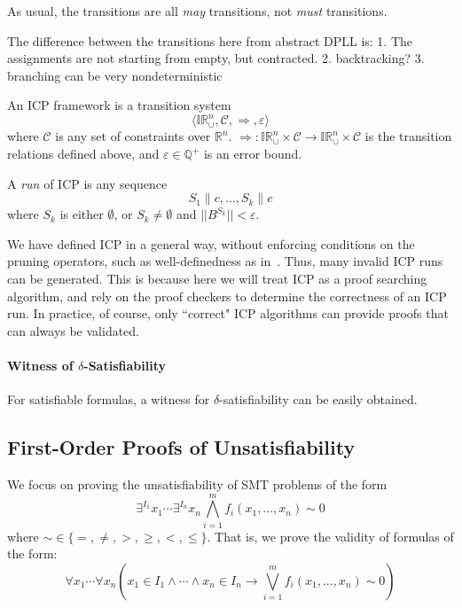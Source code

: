 \documentclass[envcountsect]{llncs}
\begin{document}
As usual, the transitions are all {\em may} transitions, not {\em must}
transitions.
\begin{remark}
The difference between the transitions here from abstract DPLL is:
1. The assignments are not starting from empty, but contracted.
2. backtracking?
3. branching can be very nondeterministic
\end{remark}
\begin{definition}
An ICP framework is a transition system
$$\langle \mathbb{IR}_{\cup}^n, \mathcal{C}, \Longrightarrow,
\varepsilon\rangle$$
where $\mathcal{C}$ is any set of constraints over $\mathbb{R}^n$.
$\Longrightarrow: \mathbb{IR}_{\cup}^n\times
\mathcal{C}\rightarrow \mathbb{IR}_{\cup}^n\times \mathcal{C}$ is the transition
relations defined above, and $\varepsilon\in \mathbb{Q}^+$ is an
error bound.

A {\em run} of ICP is any sequence
$$S_1\parallel c, ... , S_k\parallel c$$
where $S_k$ is either $\emptyset$, or $S_k\neq \emptyset$ and
$||B^{S_k}||<\varepsilon$.
\end{definition}
\begin{remark}
We have defined ICP in a general way, without enforcing conditions
on the pruning operators, such as well-definedness as in~\cite{}. Thus, many
invalid ICP runs can be generated. This is
because here we will treat ICP as a proof searching algorithm, and rely on the
proof checkers to determine the correctness of an ICP run. In practice, of
course, only
``correct" ICP algorithms can provide proofs that can always be validated.
\end{remark}




\paragraph{Witness of $\delta$-Satisfiability}
For satisfiable formulas, a witness for $\delta$-satisfiability can be
easily obtained.


\subsection{First-Order Proofs of Unsatisfiability}

We focus on proving the unsatisfiability of SMT problems of the form
$$\exists^{I_1} x_1\cdots \exists^{I_n} x_n \bigwedge_{i=1}^m
f_i(x_1,...,x_n)\sim 0$$
where $\sim \in \{=,\neq, >, \geq, <, \leq\}$. That is, we prove the validity
of formulas of the form:
$$\forall x_1 \cdots \forall x_n (x_1\in I_1\wedge \cdots \wedge x_n\in I_n
\rightarrow \bigvee_{i=1}^m f_i(x_1,...,x_n)\sim 0)$$
\end{document}
